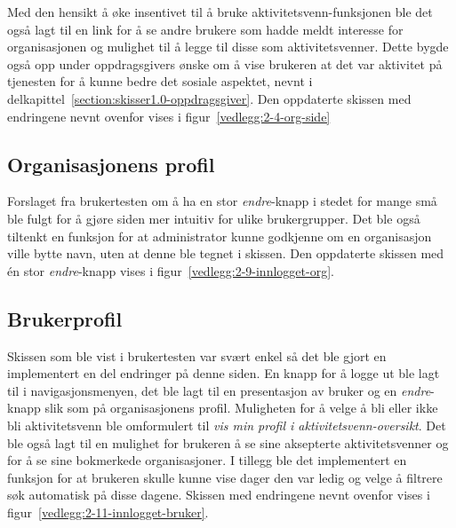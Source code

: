 Med den hensikt å øke insentivet til å bruke aktivitetsvenn-funksjonen ble det også lagt til en link for å se andre brukere som hadde meldt interesse for organisasjonen og mulighet til å legge til disse som aktivitetsvenner. Dette bygde også opp under oppdragsgivers ønske om å vise brukeren at det var aktivitet på tjenesten for å kunne bedre det sosiale aspektet, nevnt i delkapittel~\ref{section:skisser1.0-oppdragsgiver}. Den oppdaterte skissen med endringene nevnt ovenfor vises i figur~\ref{vedlegg:2-4-org-side}

\subsection{Organisasjonens profil}

Forslaget fra brukertesten om å ha en stor {\em  endre}-knapp i stedet for mange små ble fulgt for å gjøre siden mer intuitiv for ulike brukergrupper. Det ble også tiltenkt en funksjon for at administrator kunne godkjenne om en organisasjon ville bytte navn, uten at denne ble tegnet i skissen. Den oppdaterte skissen med én stor {\em  endre}-knapp vises i figur~\ref{vedlegg:2-9-innlogget-org}.

\subsection{Brukerprofil}
 
Skissen som ble vist i brukertesten var svært enkel så det ble gjort en implementert en del endringer på denne siden. En knapp for å logge ut ble lagt til i navigasjonsmenyen, det ble lagt til en presentasjon av bruker og en {\em  endre}-knapp slik som på organisasjonens profil. Muligheten for å velge å bli eller ikke bli aktivitetsvenn ble omformulert til {\em  vis min profil i aktivitetsvenn-oversikt}. Det ble også lagt til en mulighet for brukeren å se sine aksepterte aktivitetsvenner og for å se sine bokmerkede organisasjoner. I tillegg ble det implementert en funksjon for at brukeren skulle kunne vise dager den var ledig og velge å filtrere søk automatisk på disse dagene. Skissen med endringene nevnt ovenfor vises i figur~\ref{vedlegg:2-11-innlogget-bruker}.

